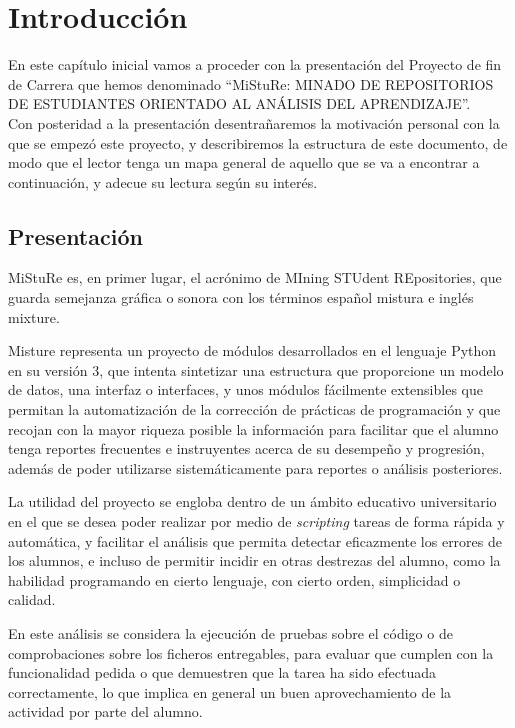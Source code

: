 \chapter{Introducción}
\label{sec:intro}

En este capítulo inicial vamos a proceder con la presentación del Proyecto de fin de Carrera que hemos denominado “MiStuRe: MINADO DE REPOSITORIOS DE ESTUDIANTES ORIENTADO AL ANÁLISIS DEL APRENDIZAJE”.\\


Con posteridad a la presentación desentrañaremos la motivación personal con la que se empezó este proyecto, y describiremos la estructura de este documento, de modo que el lector tenga un mapa general de aquello que se va a encontrar a continuación, y adecue su lectura según su interés.



\section{Presentación}

MiStuRe es, en primer lugar, el acrónimo de MIning STUdent REpositories, que guarda semejanza gráfica o sonora con los términos español mistura e inglés mixture.


Misture representa un proyecto de módulos desarrollados en el lenguaje Python en su versión 3, que intenta sintetizar una estructura que proporcione un modelo de datos, una interfaz o interfaces, y unos módulos fácilmente extensibles que permitan la automatización de la corrección de prácticas de programación y que recojan con la mayor riqueza posible la información para facilitar que el alumno tenga reportes frecuentes e instruyentes acerca de su desempeño y progresión, además de poder utilizarse sistemáticamente para reportes o análisis posteriores.


La utilidad del proyecto se engloba dentro de un ámbito educativo universitario en el que se desea poder realizar por medio de \textit{scripting} tareas de forma rápida y automática, y facilitar el análisis que permita detectar eficazmente los errores de los alumnos, e incluso de permitir incidir en otras destrezas del alumno, como la habilidad programando en cierto lenguaje, con cierto orden, simplicidad o calidad.


En este análisis se considera la ejecución de pruebas sobre el código o de comprobaciones sobre los ficheros entregables, para evaluar que cumplen con la funcionalidad pedida o que demuestren que la tarea ha sido efectuada correctamente, lo que implica en general un buen aprovechamiento de la actividad por parte del alumno.


